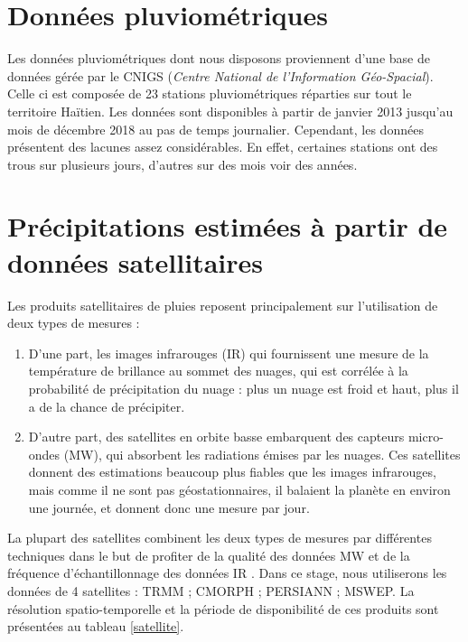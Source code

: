 
\section{Données pluviométriques}
Les données pluviométriques dont nous disposons proviennent d'une base de données gérée par le CNIGS (\emph{Centre National de l'Information G\'eo-Spacial}). Celle ci est composée de 23 stations pluviométriques r\'eparties sur tout le territoire Haïtien. Les données sont disponibles \`a partir de janvier 2013 jusqu'au mois de décembre 2018 au pas de temps journalier. Cependant, les données présentent des lacunes assez considérables. En effet, certaines stations ont des trous sur plusieurs jours, d'autres sur des mois voir des années. 

\section{Précipitations estimées \`a partir de données satellitaires}
 Les produits satellitaires de pluies reposent principalement sur l'utilisation de deux types de
mesures :
\begin{enumerate}
\item  D'une part, les images infrarouges (IR) qui fournissent une mesure de la température de brillance au sommet des nuages, qui est corrélée à la probabilité de précipitation du nuage : plus un nuage est froid et haut, plus il a de la chance de précipiter. 
\item  D'autre part, des satellites en orbite basse embarquent des capteurs micro-ondes (MW), qui absorbent les radiations émises par les nuages. Ces satellites donnent des estimations beaucoup plus fiables que les images infrarouges, mais comme il ne sont pas géostationnaires, il balaient la planète en environ une journée, et donnent donc une mesure par jour.
\end{enumerate}
La plupart des satellites combinent les deux types de mesures par différentes techniques dans le but de profiter de la qualité des données MW et de la fréquence d'échantillonnage des données IR  \cite{brochart_correction_2014}. Dans ce stage, nous utiliserons les données de 4 satellites : TRMM ; CMORPH ; PERSIANN ; MSWEP. La résolution spatio-temporelle et la période de disponibilité de ces produits sont présentées au tableau \ref{satellite}.

